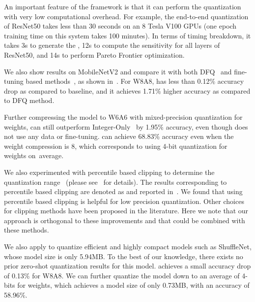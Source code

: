 An important feature of the \OURS framework is that it can perform the quantization with very low
computational overhead. For example, the end-to-end quantization of ResNet50 takes less than 30 seconds
 on an 8 Tesla V100 GPUs (one epoch training time on this system takes 100 minutes).
In terms of timing breakdown, it takes 3s to generate the \rg, 12s to compute the sensitivity for all layers of ResNet50, and 14s to perform Pareto Frontier optimization.


We also show \OURS results on MobileNetV2 and compare it with both DFQ~\cite{nagel2019data} and fine-tuning based methods~\cite{park2018value,jacob2018quantization}, as shown in~. 
For W8A8, \OURS has less than 0.12\% accuracy drop as compared to baseline, and it achieves 1.71\% higher
accuracy as compared to DFQ method. 

Further compressing the model to W6A6 with mixed-precision quantization for weights, \OURS can still outperform Integer-Only~\cite{jacob2018quantization} by 1.95\% accuracy, even though \OURS does not use any data or fine-tuning. 
\OURS can achieve 68.83\% accuracy even when the weight compression is 8, which corresponds to using 4-bit quantization for weights on~average.


We also experimented with percentile based clipping to determine the quantization range~\cite{li2019fully} (please see~ for details). The results corresponding to percentile based clipping
are denoted as  and reported in~. We found
that using percentile based clipping is helpful for low precision quantization.
Other choices for clipping methods have been proposed in the literature.
Here we note that our approach is orthogonal to these improvements and that \OURS could
be combined with these methods. 




We also apply \OURS to quantize efficient and highly compact models such as ShuffleNet, whose model size is only 5.94MB.
To the best of our knowledge, there exists no prior zero-shot quantization results for this model.
\OURS  achieves a small accuracy drop of 0.13\% for W8A8.
We can further quantize the model down to an average of 4-bits for weights, which achieves a model size of
only 0.73MB, with an accuracy of 58.96\%.


